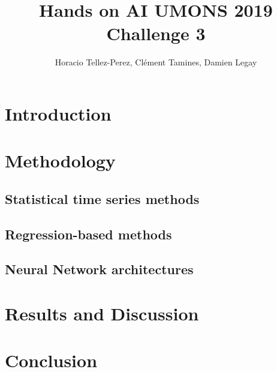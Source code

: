 \documentclass[a4paper]{article}
\title{Hands on AI UMONS 2019 Challenge 3}
\author{
	Horacio Tellez-Perez, Cl\'ement Tamines, Damien Legay
}
\begin{document}
	\maketitle

\section{Introduction}

\section{Methodology}

\subsection{Statistical time series methods}

\subsection{Regression-based methods}

\subsection{Neural Network architectures}

\section{Results and Discussion}

\section{Conclusion}
	
\end{document}
